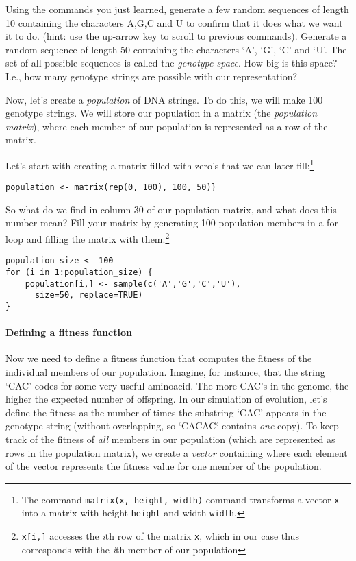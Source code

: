 \documentclass[a4paper, 9pt]{article}
\begin{document}
\begin{exercise}
    \action Using the commands you just learned, generate a few random sequences of length 10 containing the characters A,G,C and U to confirm that it does what we want it to do. (hint: use the up-arrow key to scroll to previous commands).
    \action Generate a random sequence of length 50 containing the characters `A', `G', `C' and `U'. 
    \askstar The set of all possible sequences is called the \textit{genotype space}. How big is this space? I.e., how many genotype strings are possible with our representation?
\end{exercise}

Now, let's create a \textit{population} of DNA strings. To do this, we
will make 100 genotype strings.
We will store our population in a matrix (the \textit{population matrix}), where each member of our population is represented as a row of the matrix. 

\begin{exercise}
\action Let's start with creating a matrix filled with zero's that we can later fill:\footnote{The command \texttt{matrix(x, height, width)} command transforms a vector \texttt{x} into a matrix with height \texttt{height} and width \texttt{width}.} 
  \begin{lstlisting}
population <- matrix(rep(0, 100), 100, 50)}
\end{lstlisting}
  So what do we find in column 30 of our population matrix, and what does this number mean?
  \action Fill your matrix by generating 100 population members in a for-loop and filling the matrix with them:\footnote{\texttt{x[i,]} accesses the \textit{i}th row of the matrix \texttt{x}, which in our case thus corresponds with the \textit{i}th member of our population}
  \begin{lstlisting}
population_size <- 100
for (i in 1:population_size) {
    population[i,] <- sample(c('A','G','C','U'), 
      size=50, replace=TRUE)
}
    \end{lstlisting}
\end{exercise}


\paragraph{Defining a fitness function}
Now we need to define a fitness function that computes the fitness of
the individual members of our population. Imagine, for instance, that
the string `CAC' codes for some very useful aminoacid. The more CAC's in
the genome, the higher the expected number of offspring. In our
simulation of evolution, let's define the fitness as the number of times
the substring `CAC' appears in the genotype string (without overlapping, so `CACAC` contains \emph{one} copy).
To keep track of the fitness of \textit{all} members in our population
(which are represented as rows in the population matrix), we create a
\textit{vector} containing where each element of the vector represents
the fitness value for one member of the population.
\end{document}
